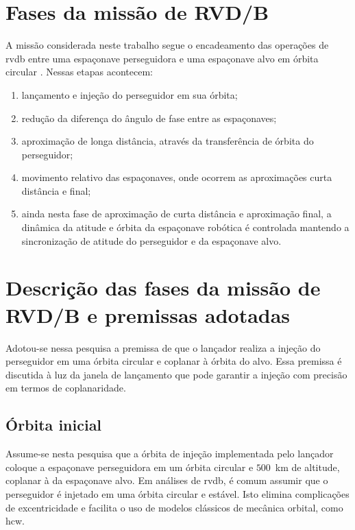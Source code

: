 \section{Fases da missão de RVD/B}

A missão considerada neste trabalho segue o encadeamento das operações de \gls{rvdb} entre uma espaçonave perseguidora e uma espaçonave alvo em órbita circular \cite{fehse2003}. Nessas etapas acontecem:

\begin{enumerate}[label=(\roman*)]
  \item lançamento e injeção do perseguidor em sua órbita;
  \item redução da diferença do ângulo de fase entre as espaçonaves;
  \item aproximação de longa distância, através da transferência de órbita do perseguidor;
  \item movimento relativo das espaçonaves, onde ocorrem as aproximações curta distância e final;
  \item ainda nesta fase de aproximação de curta distância e aproximação final, a dinâmica da atitude e órbita da espaçonave robótica é controlada mantendo a sincronização de atitude do perseguidor e da espaçonave alvo.
\end{enumerate}


\section{Descrição das fases da missão de RVD/B e premissas adotadas}

Adotou-se nessa pesquisa a premissa de que o lançador realiza a injeção do perseguidor em uma órbita circular e coplanar à órbita do alvo.
Essa premissa é discutida à luz da janela de lançamento que pode garantir a injeção com precisão em termos de coplanaridade.

\subsection{Órbita inicial}
\label{sec:fases_orbita_inicial}

Assume-se nesta pesquisa que a órbita de injeção implementada pelo lançador coloque a espaçonave perseguidora em um órbita circular e $500$~km de altitude, coplanar à da espaçonave alvo. 
Em análises de \gls{rvdb}, é comum assumir que o perseguidor é injetado em uma órbita circular e estável.
Isto elimina complicações de excentricidade e facilita o uso de modelos clássicos de mecânica orbital, como \gls{hcw}.

